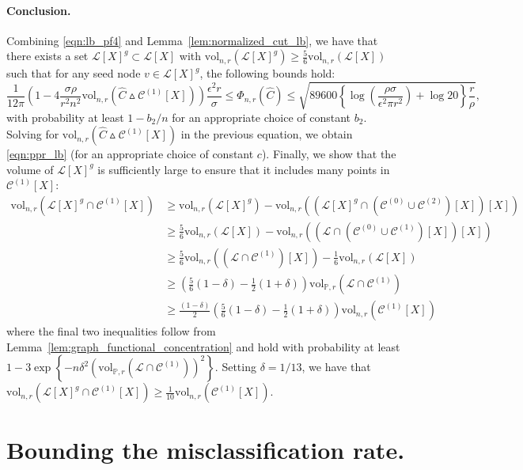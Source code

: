 \documentclass[11pt,twoside]{article}
\newcommand{\set}[1]{\left\{#1\right\}}
\newcommand{\vol}{\mathrm{vol}}
\newcommand{\1}{\mathbbm{1}}
\newcommand{\Xbf}{X}
\newcommand{\Pbb}{\mathbb{P}}
\newcommand{\Cset}{\mathcal{C}}
\newcommand{\Cest}{\widehat{C}}
\begin{document}
\paragraph{Conclusion.}
Combining \eqref{eqn:lb_pf4} and Lemma~\ref{lem:normalized_cut_lb}, we have that there exists a set $\mathcal{L}[\Xbf]^g \subset \mathcal{L}[\Xbf]$ with $\vol_{n,r}(\mathcal{L}[\Xbf]^g) \geq \frac{5}{6}\vol_{n,r}(\mathcal{L}[\Xbf])$ such that for any seed node $v \in \mathcal{L}[\Xbf]^g$, the following bounds hold:
\begin{equation*}
\frac{1}{12\pi} \left(1 - 4\frac{\sigma \rho}{r^2 n^2} \vol_{n,r}(\Cest \vartriangle \Cset^{(1)}[\Xbf]) \right) \frac{\epsilon^2 r}{\sigma} \leq \Phi_{n,r}(\Cest) \leq \sqrt{89600\left\{\log\left(\frac{\rho \sigma}{\epsilon^2 \pi r^2}\right) + \log 20\right\} \frac{r}{\rho}},
\end{equation*}
with probability at least $1 - b_2/n$ for an appropriate choice of constant $b_2$. Solving for $\vol_{n,r}(\Cest \vartriangle \Cset^{(1)}[\Xbf])$ in the previous equation, we obtain \eqref{eqn:ppr_lb} (for an appropriate choice of constant $c$).
Finally, we show that the volume of $\mathcal{L}[\Xbf]^g$ is sufficiently large to ensure that it includes many points in $\Cset^{(1)}[\Xbf]$:
\begin{align*}
\vol_{n,r}(\mathcal{L}[\Xbf]^g \cap \Cset^{(1)}[\Xbf]) & \geq  \vol_{n,r}(\mathcal{L}[\Xbf]^g) - \vol_{n,r}((\mathcal{L}[\Xbf]^g \cap (\Cset^{(0)} \cup \Cset^{(2)})[\Xbf])[\Xbf]) \\
& \geq \frac{5}{6}\vol_{n,r}(\mathcal{L}[\Xbf]) - \vol_{n,r}((\mathcal{L} \cap (\Cset^{(0)} \cup \Cset^{(1)})[\Xbf])[\Xbf]) \\
& \geq \frac{5}{6}\vol_{n,r}((\mathcal{L} \cap \Cset^{(1)})[\Xbf]) - \frac{1}{6}\vol_{n,r}(\mathcal{L}[\Xbf]) \\
& \geq \left(\frac{5}{6}(1 - \delta) - \frac{1}{2}(1 + \delta)\right)\vol_{\Pbb,r}( \mathcal{L} \cap \Cset^{(1)}) \\
& \geq \frac{(1 - \delta)}{2}\left(\frac{5}{6}(1 - \delta) - \frac{1}{2}(1 + \delta)\right)\vol_{n,r}(\Cset^{(1)}[\Xbf])
\end{align*}
where the final two inequalities follow from Lemma~\ref{lem:graph_functional_concentration} and hold with probability at least $1 - 3\exp\set{-n\delta^2(\vol_{\Pbb,r}( \mathcal{L} \cap \Cset^{(1)}))^2}$. Setting $\delta = 1/13$, we have that $\vol_{n,r}(\mathcal{L}[\Xbf]^g \cap \Cset^{(1)}[\Xbf]) \geq \frac{1}{10}\vol_{n,r}(\Cset^{(1)}[\Xbf])$.

\section{Bounding the misclassification rate.}
\label{sec: proof_of_misclassification_rate}
\end{document}
